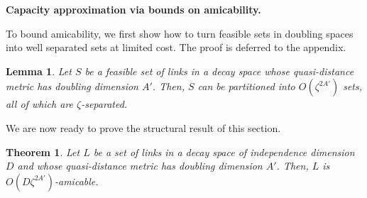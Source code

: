 \documentclass[11pt]{amsart}
\newcounter{foo}
\newtheorem{theorem}[foo]{Theorem}
\newtheorem{lemma}{Lemma}[section]
\newcommand{\mypara}[1]{\smallskip\noindent\textbf{#1.}}  \newcommand{\tightpara}[1]{\noindent\textbf{#1.}}  \newcommand{\inddim}{D}
\begin{document}
\mypara{Capacity approximation via bounds on amicability}

To bound amicability, we first show how to turn feasible
sets in doubling spaces into well separated sets at 
limited cost. The proof is deferred to the appendix.

\begin{lemma}
  Let $S$ be a feasible set of links in a decay space whose
  quasi-distance metric has doubling dimension $A'$.  Then, $S$ can be
  partitioned into $O(\zeta^{2A'})$ sets, all of which are
  $\zeta$-separated.
\label{lem:planar_separation}
\end{lemma}

We are now ready to prove the structural result of this section.

\begin{theorem}
  Let $L$ be a set of links in a decay space of independence dimension
  $\inddim$ and whose quasi-distance metric has doubling dimension
  $A'$.  Then, $L$ is $O(\inddim \zeta^{2A'})$-amicable.
\label{thm:indep}
\end{theorem}
\end{document}
